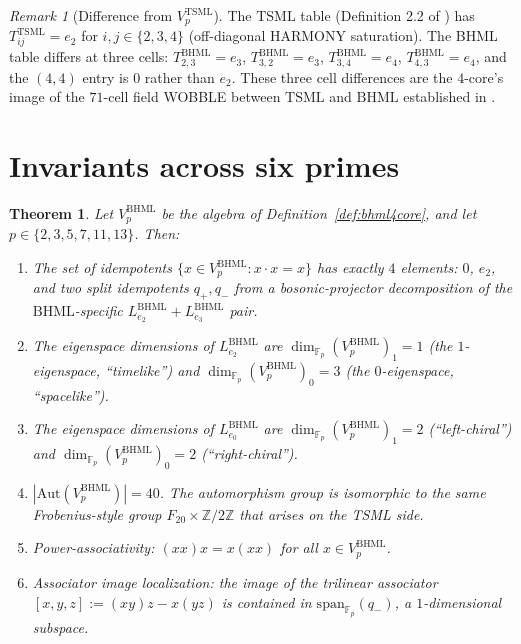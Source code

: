 \documentclass[11pt,reqno]{amsart}
\theoremstyle{plain}
\newtheorem{theorem}{Theorem}[section]
\theoremstyle{definition}
\theoremstyle{remark}
\newtheorem*{remark}{Remark}
\newcommand{\Z}{\mathbb{Z}}
\newcommand{\F}{\mathbb{F}}
\newcommand{\TSML}{\mathrm{TSML}}
\newcommand{\BHML}{\mathrm{BHML}}
\newcommand{\Aut}{\mathrm{Aut}}
\begin{document}
\begin{remark}[Difference from $V_p^\TSML$]
The $\TSML$ table (Definition 2.2 of \cite{SandersGishFpTSML}) has
$T^\TSML_{ij} = e_2$ for $i, j \in \{2, 3, 4\}$ (off-diagonal HARMONY
saturation). The BHML table differs at three cells:
$T^\BHML_{2,3} = e_3$, $T^\BHML_{3,2} = e_3$,
$T^\BHML_{3,4} = e_4$, $T^\BHML_{4,3} = e_4$, and the $(4,4)$ entry
is $0$ rather than $e_2$. These three cell differences are the
$4$-core's image of the $71$-cell field WOBBLE between $\TSML$ and
$\BHML$ established in \cite{SandersGishFieldWobble}.
\end{remark}

\section{Invariants across six primes}
\label{sec:invariants}

\begin{theorem}\label{thm:fpuniversal-bhml}
Let $V_p^\BHML$ be the algebra of Definition~\ref{def:bhml4core}, and
let $p \in \{2, 3, 5, 7, 11, 13\}$. Then:
\begin{enumerate}[label={\emph{(\arabic*)}}]
\item The set of idempotents $\{x \in V_p^\BHML : x \cdot x = x\}$
has exactly $4$ elements: $0$, $e_2$, and two split idempotents
$q_+, q_-$ from a bosonic-projector decomposition of the
$\BHML$-specific $L_{e_2}^\BHML + L_{e_3}^\BHML$ pair.
\item The eigenspace dimensions of $L_{e_2}^\BHML$ are
$\dim_{\F_p} (V_p^\BHML)_1 = 1$ (the $1$-eigenspace, ``timelike'')
and $\dim_{\F_p} (V_p^\BHML)_0 = 3$ (the $0$-eigenspace, ``spacelike'').
\item The eigenspace dimensions of $L_{e_0}^\BHML$ are
$\dim_{\F_p} (V_p^\BHML)_1 = 2$ (``left-chiral'') and
$\dim_{\F_p} (V_p^\BHML)_0 = 2$ (``right-chiral'').
\item $|\Aut(V_p^\BHML)| = 40$. The automorphism group is isomorphic
to the same Frobenius-style group $F_{20} \times \Z/2\Z$ that arises
on the TSML side.
\item Power-associativity: $(xx)x = x(xx)$ for all
$x \in V_p^\BHML$.
\item Associator image localization: the image of the trilinear
associator $[x,y,z] := (xy)z - x(yz)$ is contained in
$\mathrm{span}_{\F_p}(q_-)$, a $1$-dimensional subspace.
\end{enumerate}
\end{theorem}
\end{document}
